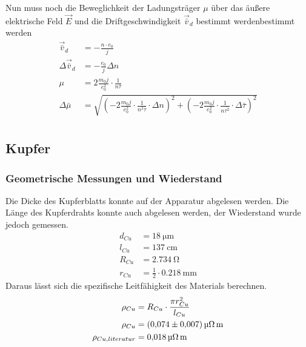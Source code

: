 Nun muss noch die Beweglichkeit der Ladungsträger $\mu$ über das äußere elektrische Feld $\vec{E}$ und die Driftgeschwindigkeit $\vec{\bar{v}}_d$ bestimmt werdenbestimmt werden
\begin{align*}
    \vec{\bar{v}}_d &= -\frac{n \cdot e_0}{j} \\
    \Delta \vec{\bar{v}}_d &= - \frac{e_0}{j}\Delta{n}\\
    \mu &= 2 \frac{m_0 j}{e_0^2} \cdot \frac{1}{n  \bar{\tau}}\\
    \Delta \bar{\mu} &= \sqrt{
        \left( -2 \frac{m_0 j}{e_0^2} \cdot \frac{1}{n^2 \bar{\tau}} \cdot \Delta n \right)^2 
        + \left( -2 \frac{m_0 j}{e_0^2} \cdot \frac{1}{n \bar{\tau^2}} \cdot \Delta \bar{\tau} \right)^2 
        }\\
\end{align*}



\subsection{Kupfer}
\subsubsection{Geometrische Messungen und Wiederstand}
Die Dicke des Kupferblatts konnte auf der Apparatur abgelesen werden.
Die Länge des Kupferdrahts konnte auch abgelesen werden, der Wiederstand wurde jedoch gemessen.
\begin{align*}
    d_{Cu} &= \SI{18}{\micro \meter} \\
    l_{Cu} &= \SI{137}{\centi \meter}\\
    R_{Cu} &= \SI{2,734}{\ohm}\\
    r_{Cu} &= \frac{1}{2}\cdot \SI{0,218}{\milli \meter}
\end{align*}
Daraus lässt sich die spezifische Leitfähigkeit des Materials berechnen.
\begin{align*}
    \rho_{Cu} &= R_{Cu}\cdot \frac{\pi r_{Cu}^2}{l_{Cu}}\\
    \rho_{Cu} &= \SI{0,074\pm0,007}{\micro \ohm \meter}\\
    \rho_{Cu,literatur} &= \SI{0,018}{\micro \ohm \meter} %
\end{align*}
